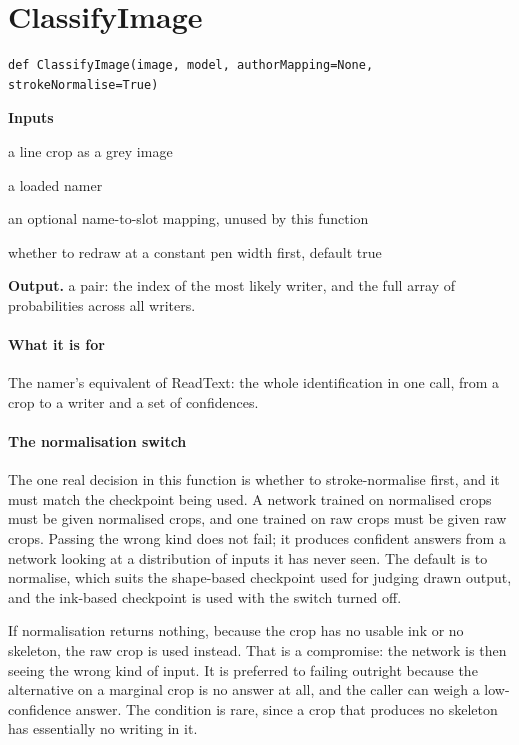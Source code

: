 \section{ClassifyImage}
\begin{lstlisting}[style=sig]
def ClassifyImage(image, model, authorMapping=None, strokeNormalise=True)
\end{lstlisting}

\noindent\textbf{Inputs}
\begin{description}[leftmargin=2.2em,style=nextline,font=\normalfont\ttfamily]\setlength\itemsep{1pt}
  \item[{image}] \normalfont a line crop as a grey image
  \item[{model}] \normalfont a loaded namer
  \item[{authorMapping}] \normalfont an optional name-to-slot mapping, unused by this function
  \item[{strokeNormalise}] \normalfont whether to redraw at a constant pen width first, default true
\end{description}

\noindent\textbf{Output.} a pair: the index of the most likely writer, and the full array of probabilities across all writers.


\paragraph{What it is for}
The namer's equivalent of ReadText: the whole identification in one call, from a crop to a writer and a set of confidences.


\paragraph{The normalisation switch}
The one real decision in this function is whether to stroke-normalise first, and it must match the checkpoint being used. A network trained on normalised crops must be given normalised crops, and one trained on raw crops must be given raw crops. Passing the wrong kind does not fail; it produces confident answers from a network looking at a distribution of inputs it has never seen. The default is to normalise, which suits the shape-based checkpoint used for judging drawn output, and the ink-based checkpoint is used with the switch turned off.

If normalisation returns nothing, because the crop has no usable ink or no skeleton, the raw crop is used instead. That is a compromise: the network is then seeing the wrong kind of input. It is preferred to failing outright because the alternative on a marginal crop is no answer at all, and the caller can weigh a low-confidence answer. The condition is rare, since a crop that produces no skeleton has essentially no writing in it.


